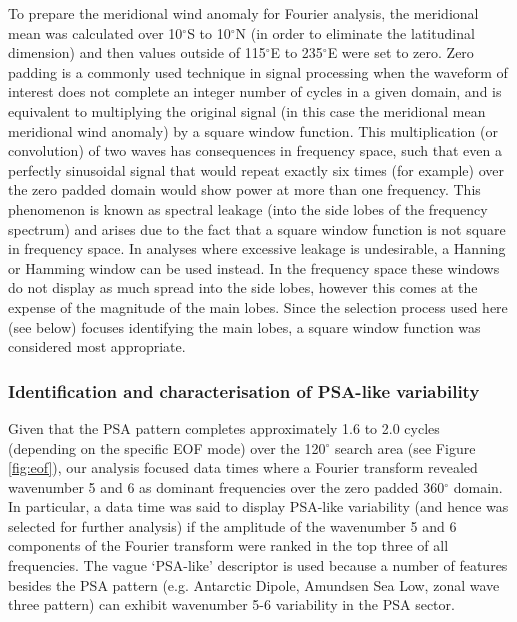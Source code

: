 To prepare the meridional wind anomaly for Fourier analysis, the meridional mean was calculated over 10$^{\circ}$S to 10$^{\circ}$N (in order to eliminate the latitudinal dimension) and then values outside of 115$^{\circ}$E to 235$^{\circ}$E were set to zero. Zero padding is a commonly used technique in signal processing when the waveform of interest does not complete an integer number of cycles in a given domain, and is equivalent to multiplying the original signal (in this case the meridional mean meridional wind anomaly) by a square window function. This multiplication (or convolution) of two waves has consequences in frequency space, such that even a perfectly sinusoidal signal that would repeat exactly six times (for example) over the zero padded domain would show power at more than one frequency. This phenomenon is known as spectral leakage (into the side lobes of the frequency spectrum) and arises due to the fact that a square window function is not square in frequency space. In analyses where excessive leakage is undesirable, a Hanning or Hamming window can be used instead. In the frequency space these windows do not display as much spread into the side lobes, however this comes at the expense of the magnitude of the main lobes. Since the selection process used here (see below) focuses identifying the main lobes, a square window function was considered most appropriate.

\subsubsection{Identification and characterisation of PSA-like variability}

Given that the PSA pattern completes approximately 1.6 to 2.0 cycles (depending on the specific EOF mode) over the 120$^{\circ}$ search area (see Figure \ref{fig:eof}), our analysis focused data times where a Fourier transform revealed wavenumber 5 and 6 as dominant frequencies over the zero padded 360$^{\circ}$ domain. In particular, a data time was said to display PSA-like variability (and hence was selected for further analysis) if the amplitude of the wavenumber 5 and 6 components of the Fourier transform were ranked in the top three of all frequencies. The vague `PSA-like' descriptor is used because a number of features besides the PSA pattern (e.g. Antarctic Dipole, Amundsen Sea Low, zonal wave three pattern) can exhibit wavenumber 5-6 variability in the PSA sector.

